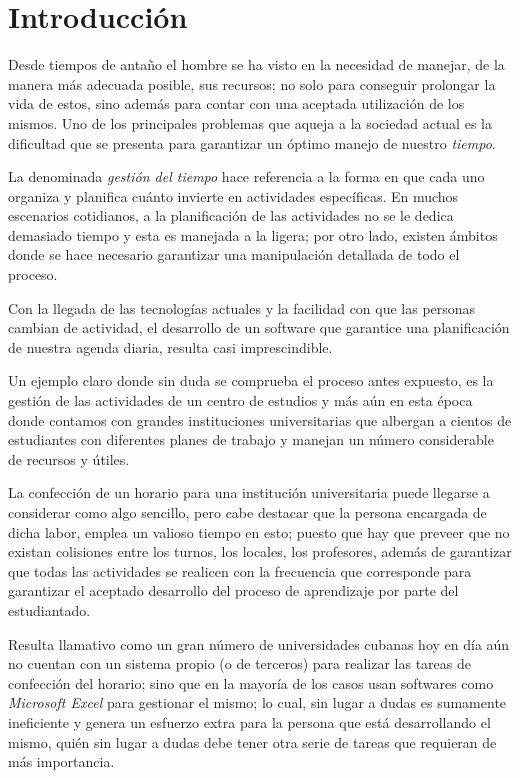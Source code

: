 \chapter{Introducción}

Desde tiempos de antaño el hombre se ha visto en la necesidad de manejar, de la manera más adecuada posible, sus recursos; no solo para conseguir prolongar la vida de estos, sino además para contar con una aceptada utilización de los mismos. Uno de los principales problemas que aqueja a la sociedad actual es la dificultad que se presenta para garantizar un óptimo manejo de nuestro \textit{tiempo}.\cite{bbc_time_management}
	
La denominada \textit{gestión del tiempo} hace referencia a la forma en que cada uno organiza y planifica cuánto invierte en actividades específicas. En muchos escenarios cotidianos, a la planificación de las actividades no se le dedica demasiado tiempo y esta es manejada a la ligera; por otro lado, existen ámbitos donde se hace necesario garantizar una manipulación detallada de todo el proceso.
	
Con la llegada de las tecnologías actuales y la facilidad con que las personas cambian de actividad, el desarrollo de un software que garantice una planificación de nuestra agenda diaria, resulta casi imprescindible.
	
Un ejemplo claro donde sin duda se comprueba el proceso antes expuesto, es la gestión de las actividades de un centro de estudios y más aún en esta época donde contamos con grandes instituciones universitarias que albergan a cientos de estudiantes con diferentes planes de trabajo y manejan un número considerable de recursos y útiles.
	
La confección de un horario para una institución universitaria puede llegarse a considerar como algo sencillo, pero cabe destacar que la persona encargada de dicha labor, emplea un valioso tiempo en esto; puesto que hay que preveer que no existan colisiones entre los turnos, los locales, los profesores, además de garantizar que todas las actividades se realicen con la frecuencia que corresponde para garantizar el aceptado desarrollo del proceso de aprendizaje por parte del estudiantado.
	
Resulta llamativo como un gran número de universidades cubanas hoy en día aún no cuentan con un sistema propio (o de terceros) para realizar las tareas de confección del horario; sino que en la mayoría de los casos usan softwares como \textit{Microsoft Excel} para gestionar el mismo; lo cual, sin lugar a dudas es sumamente ineficiente y genera un esfuerzo extra para la persona que está desarrollando el mismo, quién sin lugar a dudas debe tener otra serie de tareas que requieran de más importancia.
	
